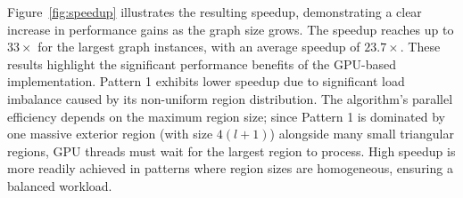 Figure~\ref{fig:speedup} illustrates the resulting speedup, demonstrating a clear increase in performance gains as the graph size grows. The speedup reaches up to $33\times$ for the largest graph instances, with an average speedup of $23.7\times$. These results highlight the significant performance benefits of the GPU-based implementation. Pattern 1 exhibits lower speedup due to significant load imbalance caused by its non-uniform region distribution. The algorithm's parallel efficiency depends on the maximum region size; since Pattern 1 is dominated by one massive exterior region (with size $4(l+1)$) alongside many small triangular regions, GPU threads must wait for the largest region to process. High speedup is more readily achieved in patterns where region sizes are homogeneous, ensuring a balanced workload.


\captionsetup[table]{skip=10pt}

